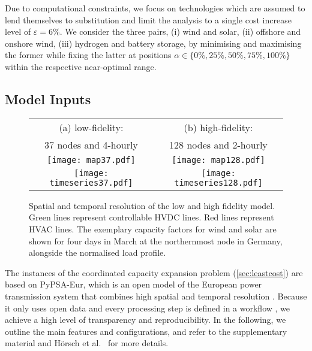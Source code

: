 Due to computational constraints, we focus on technologies which
are assumed to lend themselves to substitution and limit the analysis to a single
cost increase level of $\varepsilon=6\%$.
We consider the three pairs,
(i) wind and solar,
(ii) offshore and onshore wind,
(iii) hydrogen and battery storage,
by minimising and maximising the former while
fixing the latter at positions $\alpha \in \{0\%,25\%,50\%,75\%,100\%\}$
within the respective near-optimal range.

\subsection{Model Inputs}
\label{sec:inputs}

\begin{SCfigure}
        \begin{tabular}{cc}
            \footnotesize (a) low-fidelity: & \footnotesize (b) high-fidelity: \\
            \footnotesize 37 nodes and 4-hourly & \footnotesize 128 nodes and 2-hourly \\
            \texttt{[image: map37.pdf]} &
            \texttt{[image: map128.pdf]} \\
            \texttt{[image: timeseries37.pdf]} &
            \texttt{[image: timeseries128.pdf]} \\
        \end{tabular}
    \caption[Spatial and temporal resolution of the low and high fidelity model]{Spatial and temporal resolution of the low and high fidelity model.
    Green lines represent controllable HVDC lines. Red lines represent HVAC lines.
    The exemplary capacity factors for wind and solar are shown for four days in March
    at the northernmost node in Germany, alongside the normalised load profile.}
    \label{fig:pypsaeur}
\end{SCfigure}


The instances of the coordinated capacity expansion problem (\cref{sec:leastcost})
 are based on \mbox{PyPSA-Eur},
which is an open model of the European power transmission system
that combines high spatial and temporal resolution \cite{pypsaeur}.
Because it only uses open data
and every processing step is defined in a workflow \cite{snakemake},
we achieve a high level of transparency and reproducibility.
In the following, we outline the main features and configurations, and
refer to the supplementary material and Hörsch et al.~\cite{pypsaeur} for more details.

